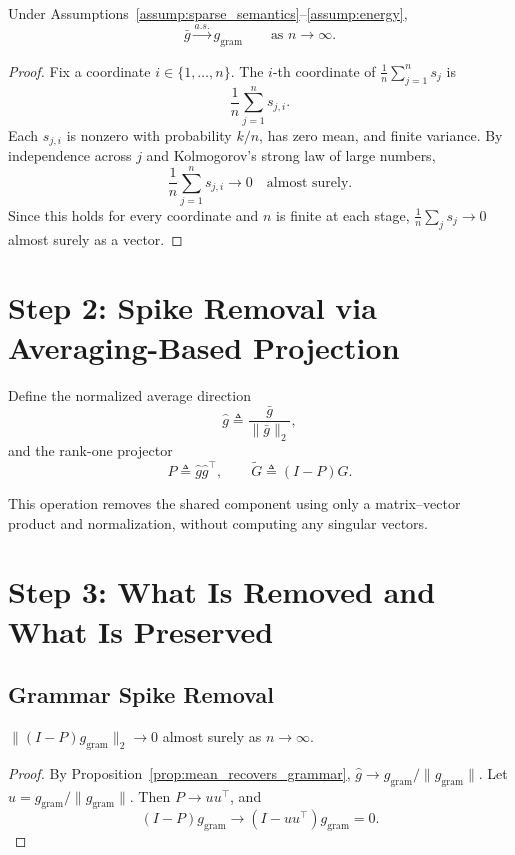 \begin{proposition}
\label{prop:mean_recovers_grammar}
Under Assumptions~\ref{assump:sparse_semantics}--\ref{assump:energy},
\[
\bar g \xrightarrow[]{a.s.} g_{\mathrm{gram}}
\qquad \text{as } n\to\infty.
\]
\end{proposition}

\begin{proof}
Fix a coordinate $i\in\{1,\dots,n\}$.
The $i$-th coordinate of $\frac{1}{n}\sum_{j=1}^n s_j$ is
\[
\frac{1}{n}\sum_{j=1}^n s_{j,i}.
\]
Each $s_{j,i}$ is nonzero with probability $k/n$, has zero mean, and finite variance.
By independence across $j$ and Kolmogorov’s strong law of large numbers,
\[
\frac{1}{n}\sum_{j=1}^n s_{j,i} \to 0 \quad \text{almost surely}.
\]
Since this holds for every coordinate and $n$ is finite at each stage,
$\frac{1}{n}\sum_j s_j \to 0$ almost surely as a vector.
\end{proof}

\section{Step 2: Spike Removal via Averaging-Based Projection}

Define the normalized average direction
\[
\hat g \triangleq \frac{\bar g}{\|\bar g\|_2},
\]
and the rank-one projector
\begin{equation}
\label{eq:P_def}
P \triangleq \hat g \hat g^\top,
\qquad
\widetilde G \triangleq (I-P)G.
\end{equation}

This operation removes the shared component using only a matrix--vector product and
normalization, without computing any singular vectors.

\section{Step 3: What Is Removed and What Is Preserved}

\subsection{Grammar Spike Removal}

\begin{proposition}
\label{prop:remove_grammar}
$\|(I-P)g_{\mathrm{gram}}\|_2 \to 0$ almost surely as $n\to\infty$.
\end{proposition}

\begin{proof}
By Proposition~\ref{prop:mean_recovers_grammar}, $\hat g \to g_{\mathrm{gram}}/\|g_{\mathrm{gram}}\|$.
Let $u = g_{\mathrm{gram}}/\|g_{\mathrm{gram}}\|$.
Then $P \to uu^\top$, and
\[
(I-P)g_{\mathrm{gram}} \to (I-uu^\top)g_{\mathrm{gram}} = 0.
\]
\end{proof}

